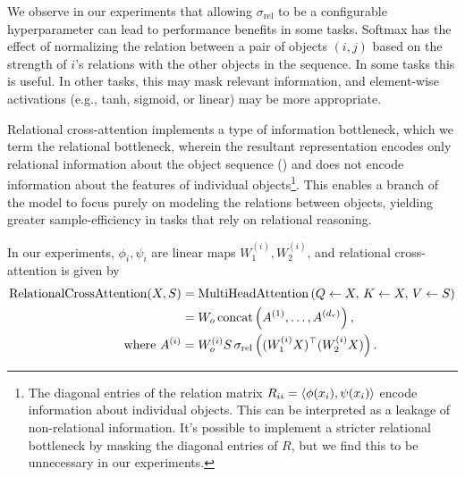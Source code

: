 We observe in our experiments that allowing $\sigma_{\mathrm{rel}}$ to be a configurable hyperparameter can lead to performance benefits in some tasks. Softmax has the effect of normalizing the relation between a pair of objects $(i,j)$ based on the strength of $i$'s relations with the other objects in the sequence. In some tasks this is useful. In other tasks, this may mask relevant information, and element-wise activations (e.g., tanh, sigmoid, or linear) may be more appropriate.

Relational cross-attention implements a type of information bottleneck, which we term the relational bottleneck, wherein the resultant representation encodes only relational information about the object sequence () and does not encode information about the features of individual objects\footnote{The diagonal entries of the relation matrix $R_{ii} = \left \langle \phi(x_i), \psi(x_i) \right\rangle$ encode information about individual objects. This can be interpreted as a leakage of non-relational information. It's possible to implement a stricter relational bottleneck by masking the diagonal entries of $R$, but we find this to be unnecessary in our experiments.}. This enables a branch of the model to focus purely on modeling the relations between objects, yielding greater sample-efficiency in tasks that rely on relational reasoning.


In our experiments, $\phi_i, \psi_i$ are linear maps $W_1^{(i)}, W_2^{(i)}$, and relational cross-attention is given by
\begin{equation}
    \begin{split}
        \mathrm{RelationalCrossAttention}(X, S) &= \mathrm{MultiHeadAttention}\left(Q \gets X,\, K \gets X,\, V \gets S\right) \\
        &= W_o \, \mathrm{concat}\left(A^{(1)}, \ldots, A^{(d_r)}\right), \\
        \text{where } A^{(i)} &= W_o^{(i)} S \, \sigma_{\mathrm{rel}}\left((W_1^{(i)} X)^\top (W_2^{(i)} X)\right).
    \end{split}
\end{equation}

